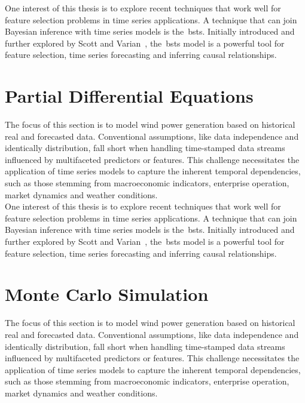     One interest of this thesis is to explore recent techniques that work well for feature selection problems in
    time series applications.
    A technique that can join Bayesian inference with time series models is the~\gls{bsts}.
    Initially introduced and further explored by Scott and Varian~\cite{scott_predicting_2013, scott_bayesian_2013},
    the~\gls{bsts} model is a powerful tool for feature selection, time series forecasting and inferring causal relationships. \\


\section{Partial Differential Equations}
    \label{sec:pde}

    The focus of this section is to model wind power generation based on historical real and forecasted data.
    Conventional assumptions, like data independence and identically distribution, fall short when handling time-stamped
    data streams influenced by multifaceted predictors or features.
    This challenge necessitates the application of time series models to capture the inherent temporal dependencies,
    such as those stemming from macroeconomic indicators, enterprise operation, market dynamics and weather conditions.\\

    One interest of this thesis is to explore recent techniques that work well for feature selection problems in
    time series applications.
    A technique that can join Bayesian inference with time series models is the~\gls{bsts}.
    Initially introduced and further explored by Scott and Varian~\cite{scott_predicting_2013, scott_bayesian_2013},
    the~\gls{bsts} model is a powerful tool for feature selection, time series forecasting and inferring causal relationships. \\


\section{Monte Carlo Simulation}
    \label{sec:mc_sim}

    The focus of this section is to model wind power generation based on historical real and forecasted data.
    Conventional assumptions, like data independence and identically distribution, fall short when handling time-stamped
    data streams influenced by multifaceted predictors or features.
    This challenge necessitates the application of time series models to capture the inherent temporal dependencies,
    such as those stemming from macroeconomic indicators, enterprise operation, market dynamics and weather conditions.\\

